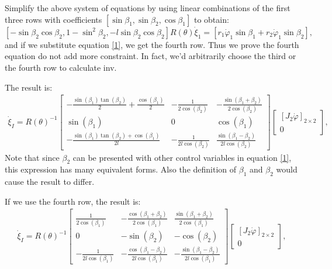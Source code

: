 \documentclass{article}
\theoremstyle{definition}
\begin{document}
	Simplify the above system of equations by using linear combinations of the first three rows with coefficients $[\sin\beta_1, \sin\beta_2, \cos\beta_1]$ to obtain:
	\begin{equation}
		\left[-\sin\beta_2\cos\beta_2, 1-\sin^2\beta_2, -l\sin\beta_2\cos\beta_2\right]R(\theta) \dot{\xi}_1=[r_1\dot\varphi_1\sin \beta_1 + r_2\dot\varphi_1\sin \beta_2], 
	\end{equation}
	and if we substitute equation \ref{1}, we get the fourth row. Thus we prove the fourth equation do not add more constraint. In fact, we'd arbitrarily choose the third or the fourth row to calculate inv.
	
	The result is:
	\begin{align}
		\dot{\xi}_I=R(\theta)^{-1}\left[\begin{matrix}- \frac{\sin{\left(\beta_{1} \right)} \tan{\left(\beta_{2} \right)}}{2} + \frac{\cos{\left(\beta_{1} \right)}}{2} & - \frac{1}{2 \cos{\left(\beta_{2} \right)}} & - \frac{\sin{\left(\beta_{1} + \beta_{2} \right)}}{2 \cos{\left(\beta_{2} \right)}}\\ \sin{\left(\beta_{1} \right)} & 0 & \cos{\left(\beta_{1} \right)}\\ - \frac{\sin{\left(\beta_{1} \right)} \tan{\left(\beta_{2} \right)} + \cos{\left(\beta_{1} \right)}}{2 l} & - \frac{1}{2 l \cos{\left(\beta_{2} \right)}} & \frac{\sin{\left(\beta_{1} - \beta_{2} \right)}}{2 l \cos{\left(\beta_{2} \right)}}\end{matrix}\right]\left[\begin{array}{c}
			\left[J_2 \dot{\varphi}\right]_{2\times 2} \\
			0
		\end{array}\right],
	\end{align}
	Note that since $\beta_2$ can be presented with other control variables in equation \ref{1}, this expression has many equivalent forms. Also the definition of $\beta_1$ and $\beta_2$ would cause the result to differ. 
	
	If we use the fourth row, the result is:
	\begin{align}
		\dot{\xi}_I=R(\theta)^{-1}\left[\begin{matrix}
			\frac{1}{2 \cos{\left(\beta_{1} \right)}} & - \frac{\cos{\left(\beta_{1} + \beta_{2} \right)}}{2 \cos{\left(\beta_{1} \right)}} & \frac{\sin{\left(\beta_{1} + \beta_{2} \right)}}{2 \cos{\left(\beta_{1} \right)}}\\
			0 & - \sin{\left(\beta_{2} \right)} & - \cos{\left(\beta_{2} \right)}\\
			- \frac{1}{2 l \cos{\left(\beta_{1} \right)}} & - \frac{\cos{\left(\beta_{1} - \beta_{2} \right)}}{2 l \cos{\left(\beta_{1} \right)}} & - \frac{\sin{\left(\beta_{1} - \beta_{2} \right)}}{2 l \cos{\left(\beta_{1} \right)}}
		\end{matrix}\right]\left[\begin{array}{c}
			\left[J_2 \dot{\varphi}\right]_{2\times 2} \\
			0
		\end{array}\right],
	\end{align}
	
\end{document}
